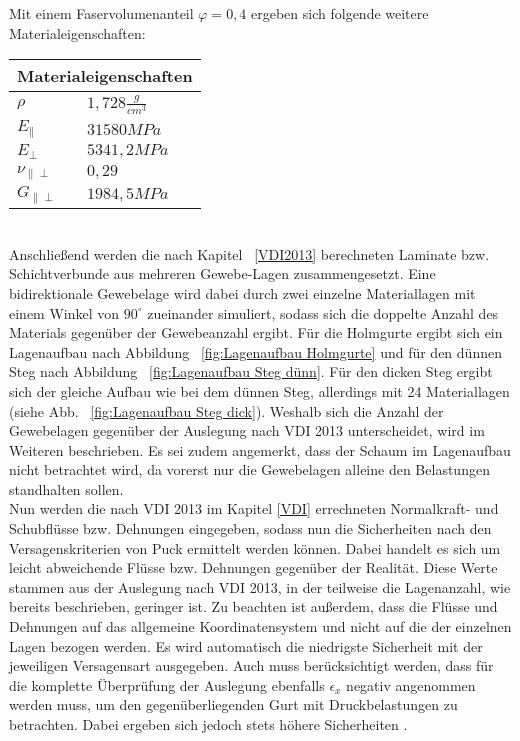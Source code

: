 \noindent Mit einem Faservolumenanteil $\varphi=0,4$ ergeben sich folgende weitere Materialeigenschaften:\\

\begin{tabular}{ll}
	\multicolumn{2}{c}{Materialeigenschaften}\\\hline\hline
	$\rho$ & $1,728 \frac{g}{cm^{3}}$ \\
	\hline
	$E_{\parallel}$ & $31580 MPa$\\
	\hline
	$E_{\perp}$ & $5341,2MPa$\\
	\hline
	$\nu_{\parallel\perp}$ & $0,29$\\
	\hline
	$G_{\parallel\perp}$ & $1984,5 MPa$\\
\end{tabular}\\

\noindent Anschließend werden die nach Kapitel ~\ref{VDI2013} berechneten Laminate bzw. Schichtverbunde aus mehreren Gewebe-Lagen zusammengesetzt. Eine bidirektionale Gewebelage wird dabei durch zwei einzelne Materiallagen mit einem Winkel von $90^{\circ}$ zueinander simuliert, sodass sich die doppelte Anzahl des Materials gegenüber der Gewebeanzahl ergibt. Für die Holmgurte ergibt sich ein Lagenaufbau nach Abbildung ~\ref{fig:Lagenaufbau Holmgurte} und für den dünnen Steg nach Abbildung ~\ref{fig:Lagenaufbau Steg dünn}. Für den dicken Steg ergibt sich der gleiche Aufbau wie bei dem dünnen Steg, allerdings mit 24 Materiallagen (siehe Abb. ~\ref{fig:Lagenaufbau Steg dick}). Weshalb sich die Anzahl der Gewebelagen gegenüber der Auslegung nach VDI 2013 unterscheidet, wird im Weiteren beschrieben. Es sei zudem angemerkt, dass der Schaum im Lagenaufbau nicht betrachtet wird, da vorerst nur die Gewebelagen alleine den Belastungen standhalten sollen.\\ 

\noindent Nun werden die nach VDI 2013 im Kapitel \ref{VDI} errechneten Normalkraft- und Schubflüsse bzw. Dehnungen eingegeben, sodass nun die Sicherheiten nach den Versagenskriterien von Puck ermittelt werden können. Dabei handelt es sich um leicht abweichende Flüsse bzw. Dehnungen gegenüber der Realität. Diese Werte stammen aus der Auslegung nach VDI 2013, in der teilweise die Lagenanzahl, wie bereits beschrieben, geringer ist. Zu beachten ist außerdem, dass die Flüsse und Dehnungen auf das allgemeine Koordinatensystem und nicht auf die der einzelnen Lagen bezogen werden. Es wird automatisch die niedrigste Sicherheit mit der jeweiligen Versagensart ausgegeben. Auch muss berücksichtigt werden, dass für die komplette Überprüfung der Auslegung ebenfalls $\epsilon_{x}$ negativ angenommen werden muss, um den gegenüberliegenden Gurt mit Druckbelastungen zu betrachten. Dabei ergeben sich jedoch stets höhere Sicherheiten \cite{item22}\cite{item3}.\\

